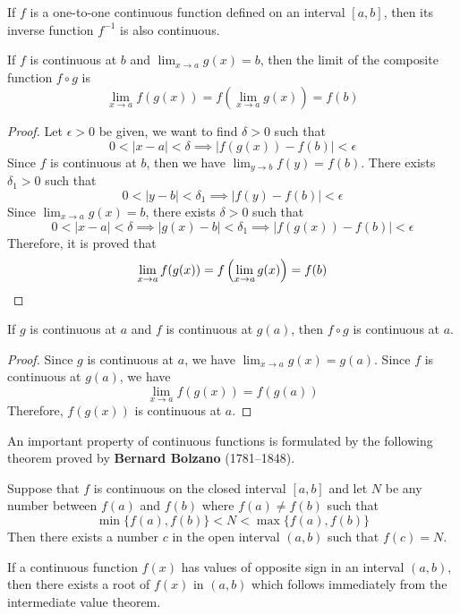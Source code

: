 \begin{theorem}
    If \(f\) is a one-to-one continuous function defined on an interval
    \([a,b]\), then its inverse function \(f^{-1}\) is also continuous.
\end{theorem}
\begin{theorem}
    If \(f\) is continuous at \(b\) and \(\lim_{x\to a}g(x)=b\), then
    the limit of the composite function \(f\circ g\) is
    \[\lim_{x\to a}f(g(x))=f\left(\lim_{x\to a}g(x)\right)=f(b)\]
\end{theorem}
\begin{proof}
    Let \(\epsilon>0\) be given, we want to find \(\delta>0\) such that
    \[0<|x-a|<\delta\implies|f(g(x))-f(b)|<\epsilon\]
    Since \(f\) is continuous at \(b\), then we have \(\lim_{y\to b}f(y)=f(b)\).
    There exists \(\delta_1>0\) such that
    \[0<|y-b|<\delta_1\implies|f(y)-f(b)|<\epsilon\]
    Since \(\lim_{x\to a}g(x)=b\), there exists \(\delta>0\) such that
    \[0<|x-a|<\delta\implies|g(x)-b|<\delta_1\implies|f(g(x))-f(b)|<\epsilon\]
    Therefore, it is proved that
    \[\lim_{x\to a}f(g(x))=f\left(\lim_{x\to a}g(x)\right)=f(b)\qedhere\]
\end{proof}
\begin{theorem}
    If \(g\) is continuous at \(a\) and \(f\) is continuous at \(g(a)\), then
    \(f\circ g\) is continuous at \(a\).
\end{theorem}
\begin{proof}
    Since \(g\) is continuous at \(a\), we have \(\lim_{x\to a}g(x)=g(a)\).
    Since \(f\) is continuous at \(g(a)\), we have
    \[\lim_{x\to a}f(g(x))=f(g(a))\]
    Therefore, \(f(g(x))\) is continuous at \(a\).
\end{proof}
An important property of continuous functions is formulated by the following
theorem proved by \textbf{Bernard Bolzano} (1781--1848).
\begin{theorem}
    Suppose that \(f\) is continuous on the closed interval \([a,b]\) and let
    \(N\) be any number between \(f(a)\) and \(f(b)\) where \(f(a)\neq f(b)\)
    such that \[\min\{f(a),f(b)\}<N<\max\{f(a),f(b)\}\]
    Then there exists a number \(c\) in the open interval \((a,b)\) such that
    \(f(c)=N\).
\end{theorem}
If a continuous function \(f(x)\) has values of opposite sign in an interval
\((a,b)\), then there exists a root of \(f(x)\) in \((a,b)\) which follows immediately from
the intermediate value theorem.